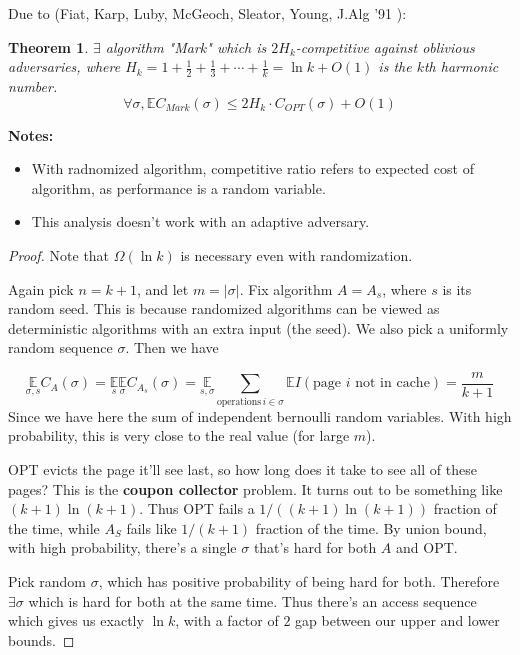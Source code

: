 \documentclass[11pt]{article}
\newtheorem{theorem}{Theorem}
\begin{document}
Due to (Fiat, Karp, Luby, McGeoch, Sleator, Young, J.Alg '91 \cite{fiat91}):

\begin{theorem}
 $\exists$ algorithm "Mark" which is $2H_k$-competitive against oblivious adversaries, where $H_k = 1 + \frac12 + \frac13 + \cdots + \frac1k = \ln k + O(1)$ is the $k$th harmonic number.
	\[
		\forall \sigma, \mathbb{E}C_{Mark}(\sigma) \leq 2H_k\cdot C_{OPT}(\sigma) + O(1)
		\]

\end{theorem}

{\bf Notes:}
\begin{itemize}
	\item With radnomized algorithm, competitive ratio refers to expected cost of algorithm, as performance is a random variable.
	\item This analysis doesn't work with an adaptive adversary.
\end{itemize}

\begin{proof}
	Note that $\Omega(\ln k)$ is necessary even with randomization.

	Again pick $n = k+1$, and let $m = |\sigma|$. Fix algorithm $A = A_s$, where $s$ is its random seed. This is because randomized algorithms can be viewed as deterministic algorithms with an extra input (the seed). We also pick a uniformly random sequence $\sigma$. Then we have

	\[
		\underset{\sigma,s}{\mathbb{E}}C_{A}(\sigma) = \underset{s}{\mathbb{E}}\underset{\sigma}{\mathbb{E}}C_{A_s}(\sigma) = \underset{s,\sigma}{\mathbb{E}}\sum_{\text{operations}\,i\in\sigma} \mathbb{E} I (\text{page }i\text{ not in cache}) = \frac{m}{k+1}
	\]
	Since we have here the sum of independent bernoulli random variables. With high probability, this is very close to the real value (for large $m$).

	OPT evicts the page it'll see last, so how long does it take to see all of these pages? This is the {\bf coupon collector} problem. It turns out to be something like $(k+1)\ln (k+1)$. Thus OPT fails a $1/((k+1)\ln (k+1))$ fraction of the time, while $A_S$ fails like $1/(k+1)$ fraction of the time. By union bound, with high probability, there's a single $\sigma$ that's hard for both $A$ and OPT.

	Pick random $\sigma$, which has positive probability of being hard for both. Therefore $\exists \sigma$ which is hard for both at the same time. Thus there's an access sequence which gives us exactly $\ln k$, with a factor of $2$ gap between our upper and lower bounds.
\end{proof}
\end{document}
